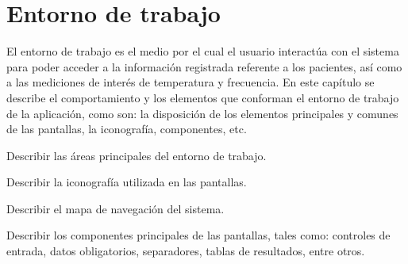 
\section{Entorno de trabajo}

    El entorno de trabajo es el medio por el cual el usuario interactúa con el sistema para poder acceder a la información registrada referente a los pacientes, así como a las mediciones de interés de temperatura y frecuencia. En este capítulo se describe el comportamiento y los elementos que conforman el entorno de 
    trabajo de la aplicación, como son: la disposición de los elementos principales y comunes de las pantallas, la iconografía, componentes, etc. \bigskip

    \begin{objetivos}
      \item Describir las áreas principales del entorno de trabajo.
      \item Describir la iconografía utilizada en las pantallas.
      \item Describir el mapa de navegación del sistema.
      \item Describir los componentes principales de las pantallas, tales como: controles de entrada, datos obligatorios, separadores, tablas de resultados, entre otros.
    \end{objetivos}
\\\\\\\\\\\\\\\\

\pagebreak
{}